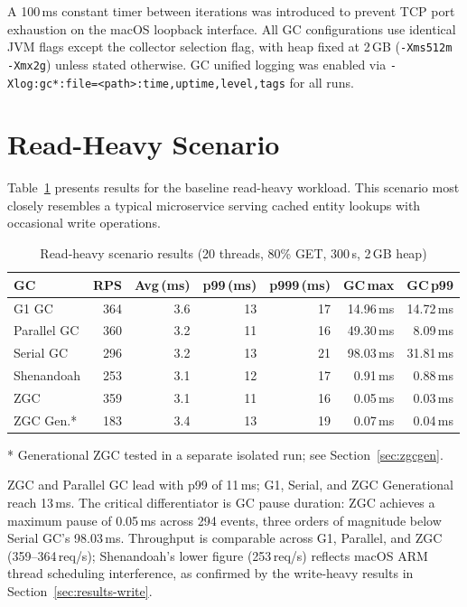 A 100\,ms constant timer between iterations was introduced to prevent TCP port exhaustion on the macOS loopback interface. All GC configurations use identical JVM flags except the collector selection flag, with heap fixed at 2\,GB (\texttt{-Xms512m -Xmx2g}) unless stated otherwise. GC unified logging was enabled via \texttt{-Xlog:gc*:file=<path>:time,uptime,level,tags} for all runs.

\section{Read-Heavy Scenario}
\label{sec:results-read}

Table~\ref{tab:results-read} presents results for the baseline read-heavy workload. This scenario most closely resembles a typical microservice serving cached entity lookups with occasional write operations.

\begin{table}[htbp]
\centering
\caption{Read-heavy scenario results (20 threads, 80\% GET, 300\,s, 2\,GB heap)}
\label{tab:results-read}
\begin{tabular}{lrrrrrr}
\hline
\textbf{GC} & \textbf{RPS} & \textbf{Avg\,(ms)} & \textbf{p99\,(ms)} & \textbf{p999\,(ms)} & \textbf{GC\,max} & \textbf{GC\,p99} \\
\hline
G1 GC       & 364 & 3.6 & 13 & 17 & 14.96\,ms & 14.72\,ms \\
Parallel GC & 360 & 3.2 & 11 & 16 & 49.30\,ms &  8.09\,ms \\
Serial GC   & 296 & 3.2 & 13 & 21 & 98.03\,ms & 31.81\,ms \\
Shenandoah  & 253 & 3.1 & 12 & 17 &  0.91\,ms &  0.88\,ms \\
ZGC         & 359 & 3.1 & 11 & 16 &  0.05\,ms &  0.03\,ms \\
ZGC Gen.*   & 183 & 3.4 & 13 & 19 &  0.07\,ms &  0.04\,ms \\
\hline
\end{tabular}

\smallskip
\footnotesize{* Generational ZGC tested in a separate isolated run; see Section~\ref{sec:zgcgen}.}
\end{table}

ZGC and Parallel GC lead with p99 of 11\,ms; G1, Serial, and ZGC Generational reach 13\,ms. The critical differentiator is GC pause duration: ZGC achieves a maximum pause of 0.05\,ms across 294 events, three orders of magnitude below Serial GC's 98.03\,ms. Throughput is comparable across G1, Parallel, and ZGC (359--364\,req/s); Shenandoah's lower figure (253\,req/s) reflects macOS ARM thread scheduling interference, as confirmed by the write-heavy results in Section~\ref{sec:results-write}.

